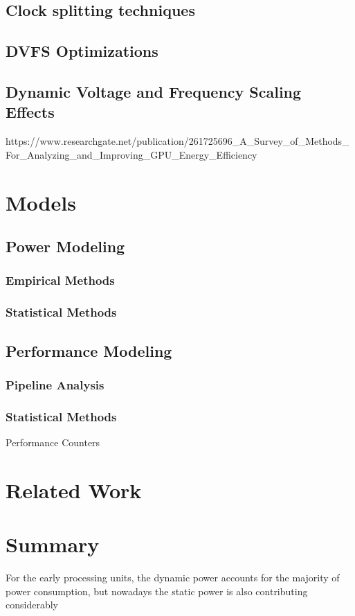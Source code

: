 


\subsection{Clock splitting techniques}

\subsection{DVFS Optimizations}



\subsection{Dynamic Voltage and Frequency Scaling Effects}
https://www.researchgate.net/publication/261725696_A_Survey_of_Methods_For_Analyzing_and_Improving_GPU_Energy_Efficiency




\section{Models}
\subsection{Power Modeling}
\label{section:powermodels}
\subsubsection{Empirical Methods}
\subsubsection{Statistical Methods}

\subsection{Performance Modeling}
\label{section:powermodels}
\subsubsection{Pipeline Analysis}
\subsubsection{Statistical Methods}
Performance Counters

\section{Related Work}

\section{Summary}


For the early processing units, the dynamic power accounts for the majority of power consumption, but nowadays the static power is also contributing considerably
